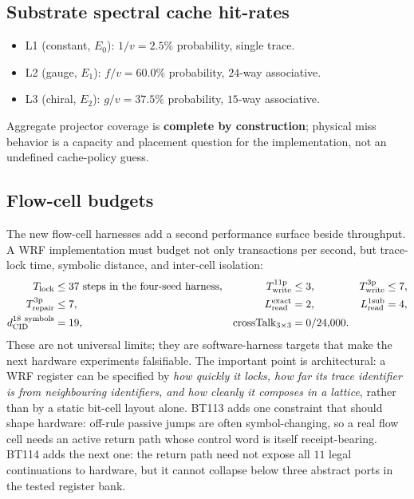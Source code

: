 \documentclass[11pt,letterpaper]{article}
\theoremstyle{remark}
\begin{document}
\subsection{Substrate spectral cache hit-rates}

\begin{itemize}[leftmargin=2em,nosep]
\item L1 (constant, $E_0$): $1/v = 2.5\%$ probability, single trace.
\item L2 (gauge, $E_1$): $f/v = 60.0\%$ probability, $24$-way associative.
\item L3 (chiral, $E_2$): $g/v = 37.5\%$ probability, $15$-way associative.
\end{itemize}
Aggregate projector coverage is \textbf{complete by construction}; physical miss behavior
is a capacity and placement question for the implementation, not an undefined cache-policy
guess.

\subsection{Flow-cell budgets}

The new flow-cell harnesses add a second performance surface beside throughput. A WRF
implementation must budget not only transactions per second, but trace-lock time,
symbolic distance, and inter-cell isolation:
\[
\begin{aligned}
T_{\rm lock}&\leq 37\ \text{steps in the four-seed harness},&
T_{\rm write}^{11{\rm p}}&\leq 3,&
T_{\rm write}^{3{\rm p}}&\leq 7,\\
T_{\rm repair}^{3{\rm p}}&\leq 7,&
L_{\rm read}^{\rm exact}&=2,&
L_{\rm read}^{1{\rm sub}}&=4,\\
d_{\rm CID}^{18\ \rm symbols}&=19,&
\mathrm{crossTalk}_{3\times3}&=0/24{,}000.
\end{aligned}
\]
These are not universal limits; they are software-harness targets that make the next
hardware experiments falsifiable. The important point is architectural: a WRF register
can be specified by \emph{how quickly it locks, how far its trace identifier is from
neighbouring identifiers, and how cleanly it composes in a lattice}, rather than by a
static bit-cell layout alone. BT113 adds one constraint that should shape hardware:
off-rule passive jumps are often symbol-changing, so a real flow cell needs an active
return path whose control word is itself receipt-bearing. BT114 adds the next one:
the return path need not expose all $11$ legal continuations to hardware, but it cannot
collapse below three abstract ports in the tested register bank.
\end{document}
